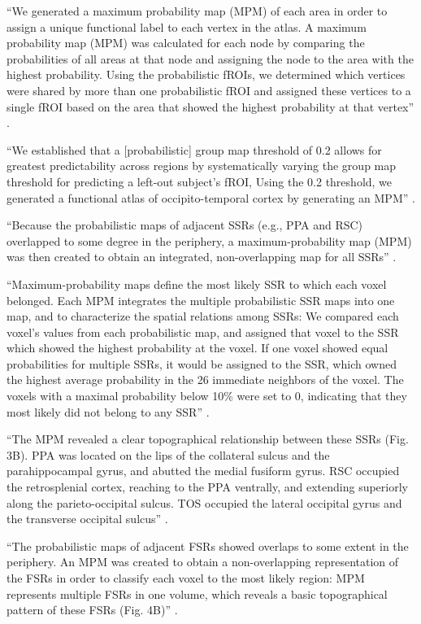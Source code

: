 %
``We generated a maximum probability map (MPM) of each area in order to assign a
unique functional label to each vertex in the atlas.
%
A maximum probability map (MPM) was calculated for each node by comparing the
probabilities of all areas at that node and assigning the node to the area with
the highest probability.
%
Using the probabilistic fROIs, we determined which vertices were shared by more
than one probabilistic fROI and assigned these vertices to a single fROI based
on the area that showed the highest probability at that vertex''
\citep{rosenke2021probabilistic}.

%
``We established that a [probabilistic] group map threshold of 0.2 allows for
greatest predictability across regions by systematically varying the group map
threshold for predicting a left-out subject's fROI,
%
Using the 0.2 threshold, we generated a functional atlas of occipito-temporal
cortex by generating an MPM'' \citep{rosenke2021probabilistic}.



%
``Because the probabilistic maps of adjacent SSRs (e.g., PPA and RSC) overlapped
to some degree in the periphery, a maximum-probability map (MPM) was then
created to obtain an integrated, non-overlapping map for all SSRs''
\citep{zhen2017quantifying}.

%
``Maximum-probability maps define the most likely SSR to which each voxel
belonged.
%
Each MPM integrates the multiple probabilistic SSR maps into one map, and to
characterize the spatial relations among SSRs:
%
We compared each voxel's values from each probabilistic map, and assigned that
voxel to the SSR which showed the highest probability at the voxel.
%
If one voxel showed equal probabilities for multiple SSRs, it would be assigned
to the SSR, which owned the highest average probability in the 26 immediate
neighbors of the voxel.
%
The voxels with a maximal probability below 10\% were set to 0, indicating that
they most likely did not belong to any SSR'' \citep{zhen2017quantifying}.


``The MPM revealed a clear topographical relationship between these SSRs (Fig.
3B).
%
PPA was located on the lips of the collateral sulcus and the parahippocampal
gyrus, and abutted the medial fusiform gyrus.
%
RSC occupied the retrosplenial cortex, reaching to the PPA ventrally, and
extending superiorly along the parieto-occipital sulcus.
%
TOS occupied the lateral occipital gyrus and the transverse occipital sulcus''
\citep{zhen2017quantifying}.


%
``The probabilistic maps of adjacent FSRs showed overlaps to some extent in the
periphery.
%
An MPM was created to obtain a non-overlapping representation of the FSRs in
order to classify each voxel to the most likely region:
%
MPM represents multiple FSRs in one volume, which reveals a basic topographical
pattern of these FSRs (Fig. 4B)'' \citet{zhen2015quantifying}.

